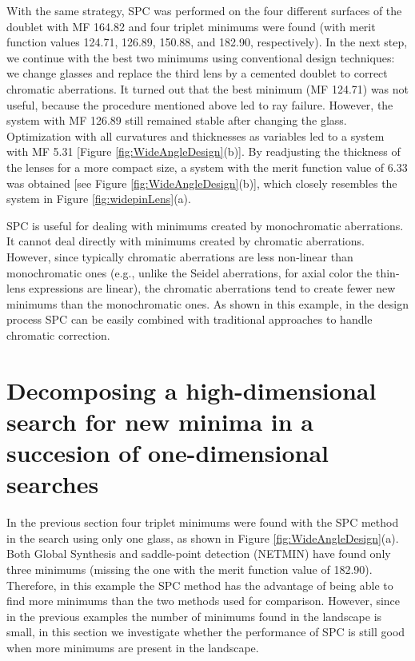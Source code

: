 With the same strategy, SPC was performed on the four different surfaces of the doublet with MF 164.82 and four triplet minimums were found (with merit function values 124.71, 126.89, 150.88, and 182.90, respectively). In the next step, we continue with the best two minimums using conventional design techniques: we change glasses and replace the third lens by a cemented doublet to correct chromatic aberrations. It turned out that the best minimum (MF 124.71) was not useful, because the procedure mentioned above led to ray failure. However, the system with MF 126.89 still remained stable after changing the glass. Optimization with all curvatures and thicknesses as variables led to a system with MF 5.31 [Figure \ref{fig:WideAngleDesign}(b)]. By readjusting the thickness of the lenses for a more compact size, a system with the merit function value of 6.33 was obtained [see Figure \ref{fig:WideAngleDesign}(b)], which closely resembles the system in Figure \ref{fig:widepinLens}(a).

SPC is useful for dealing with minimums created by monochromatic aberrations. It cannot deal directly with minimums created by chromatic aberrations. However, since typically chromatic aberrations are less non-linear than monochromatic ones (e.g., unlike the Seidel aberrations, for axial color the thin-lens expressions are linear), the chromatic aberrations tend to create fewer new minimums than the monochromatic
ones. As shown in this example, in the design process SPC can be easily combined with traditional approaches to handle chromatic correction.


\section{Decomposing a high-dimensional search for new minima in a succesion of one-dimensional searches}  \label{chrom60d}

In the previous section four triplet minimums were found with the SPC method in the search using only one glass, as shown in Figure \ref{fig:WideAngleDesign}(a). Both Global Synthesis and saddle-point detection
(NETMIN) have found only three minimums (missing the one with the merit function value of 182.90). Therefore, in this example the SPC method has the advantage of being able to find more minimums than the two methods used for comparison. However, since in the previous examples the number of minimums found in the landscape is small, in this section we investigate whether the performance of SPC is still good when more minimums are present in the landscape.

